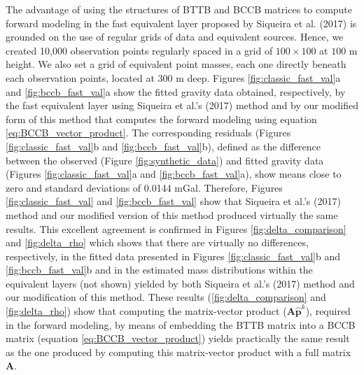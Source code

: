 \documentclass[paper]{geophysics}
\begin{document}
The advantage of using the structures of BTTB and BCCB matrices to compute forward modeling in  the fast equivalent layer proposed by Siqueira et al. (2017) is   grounded  on the use of regular grids of data and equivalent sources. Hence, we created 10,000 observation points regularly spaced in a grid of $100 \times 100$ at $100$ m height. We also set a grid of equivalent point masses, each one directly beneath each observation points, located at $300$ m deep.  Figures \ref{fig:classic_fast_val}a and \ref{fig:bccb_fast_val}a  show the fitted gravity data obtained, respectively, by the fast equivalent layer using Siqueira et al.'s (2017) method and by our modified form of this method that computes the forward modeling using equation \ref{eq:BCCB_vector_product}. The corresponding residuals (Figures \ref{fig:classic_fast_val}b and \ref{fig:bccb_fast_val}b), defined as the difference between the observed (Figure  \ref{fig:synthetic_data}) and fitted gravity data (Figures \ref{fig:classic_fast_val}a and \ref{fig:bccb_fast_val}a), show means close to zero  and standard deviations of 0.0144 mGal.  Therefore, Figures \ref{fig:classic_fast_val} and \ref{fig:bccb_fast_val} show that Siqueira et al.'s (2017) method and our modified version of this method produced virtually the same results. This excellent agreement is confirmed in Figures \ref{fig:delta_comparison} and \ref{fig:delta_rho} which shows that there are virtually no differences, respectively,  in the fitted data presented in Figures \ref{fig:classic_fast_val}b and \ref{fig:bccb_fast_val}b and in the estimated mass distributions within the equivalent layers (not shown) yielded by both Siqueira et al.'s (2017) method and our modification of this method.  These results (\ref{fig:delta_comparison} and \ref{fig:delta_rho})  show that computing the matrix-vector product ($\mathbf{A} \hat{\mathbf{p}}^k$), required in the forward modeling, by means of embedding the BTTB matrix into a BCCB matrix (equation \ref{eq:BCCB_vector_product}) yields practically the same result as the one produced by computing this matrix-vector product  with a full matrix $\mathbf{A}$.
\end{document}
